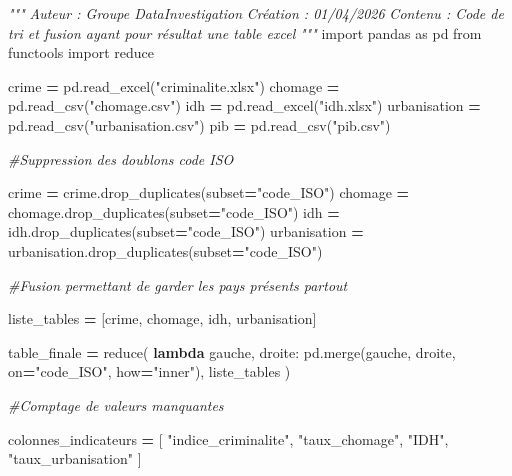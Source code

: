 \documentclass[mstat,12pt]{unswthesis}
\newenvironment{Shaded}{\begin{snugshade}}{\end{snugshade}}
\newcommand{\BuiltInTok}[1]{#1}
\newcommand{\CommentTok}[1]{\textcolor[rgb]{0.56,0.35,0.01}{\textit{#1}}}
\newcommand{\ImportTok}[1]{#1}
\newcommand{\KeywordTok}[1]{\textcolor[rgb]{0.13,0.29,0.53}{\textbf{#1}}}
\newcommand{\NormalTok}[1]{#1}
\newcommand{\OperatorTok}[1]{\textcolor[rgb]{0.81,0.36,0.00}{\textbf{#1}}}
\newcommand{\StringTok}[1]{\textcolor[rgb]{0.31,0.60,0.02}{#1}}
\begin{document}
\begin{Shaded}
\begin{Highlighting}[]
\CommentTok{"""}
\CommentTok{Auteur : Groupe DataInvestigation}
\CommentTok{Création : 01/04/2026}
\CommentTok{Contenu : Code de tri et fusion ayant pour résultat une table excel}
\CommentTok{"""}
\ImportTok{import}\NormalTok{ pandas }\ImportTok{as}\NormalTok{ pd}
\ImportTok{from}\NormalTok{ functools }\ImportTok{import} \BuiltInTok{reduce}


\NormalTok{crime }\OperatorTok{=}\NormalTok{ pd.read\_excel(}\StringTok{"criminalite.xlsx"}\NormalTok{)}
\NormalTok{chomage }\OperatorTok{=}\NormalTok{ pd.read\_csv(}\StringTok{"chomage.csv"}\NormalTok{)}
\NormalTok{idh }\OperatorTok{=}\NormalTok{ pd.read\_excel(}\StringTok{"idh.xlsx"}\NormalTok{)}
\NormalTok{urbanisation }\OperatorTok{=}\NormalTok{ pd.read\_csv(}\StringTok{"urbanisation.csv"}\NormalTok{)}
\NormalTok{pib }\OperatorTok{=}\NormalTok{ pd.read\_csv(}\StringTok{"pib.csv"}\NormalTok{)}

\CommentTok{\#Suppression des doublons code ISO}

\NormalTok{crime }\OperatorTok{=}\NormalTok{ crime.drop\_duplicates(subset}\OperatorTok{=}\StringTok{"code\_ISO"}\NormalTok{)}
\NormalTok{chomage }\OperatorTok{=}\NormalTok{ chomage.drop\_duplicates(subset}\OperatorTok{=}\StringTok{"code\_ISO"}\NormalTok{)}
\NormalTok{idh }\OperatorTok{=}\NormalTok{ idh.drop\_duplicates(subset}\OperatorTok{=}\StringTok{"code\_ISO"}\NormalTok{)}
\NormalTok{urbanisation }\OperatorTok{=}\NormalTok{ urbanisation.drop\_duplicates(subset}\OperatorTok{=}\StringTok{"code\_ISO"}\NormalTok{)}

\CommentTok{\#Fusion permettant de garder les pays présents partout}

\NormalTok{liste\_tables }\OperatorTok{=}\NormalTok{ [crime, chomage, idh, urbanisation]}

\NormalTok{table\_finale }\OperatorTok{=} \BuiltInTok{reduce}\NormalTok{(}
    \KeywordTok{lambda}\NormalTok{ gauche, droite: pd.merge(gauche, droite, on}\OperatorTok{=}\StringTok{"code\_ISO"}\NormalTok{, how}\OperatorTok{=}\StringTok{"inner"}\NormalTok{),}
\NormalTok{    liste\_tables}
\NormalTok{)}

\CommentTok{\#Comptage de valeurs manquantes }

\NormalTok{colonnes\_indicateurs }\OperatorTok{=}\NormalTok{ [}
    \StringTok{"indice\_criminalite"}\NormalTok{,}
    \StringTok{"taux\_chomage"}\NormalTok{,}
    \StringTok{"IDH"}\NormalTok{,}
    \StringTok{"taux\_urbanisation"}
\NormalTok{]}


\end{Highlighting}
\end{Shaded}
\end{document}
